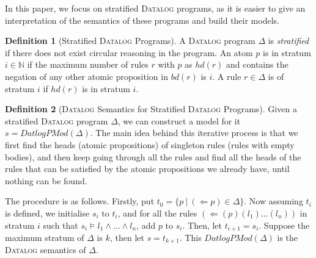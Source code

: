 \documentclass{article}
\theoremstyle{theorem}
\theoremstyle{lemma}
\theoremstyle{definition}
\newtheorem{definition}{Definition}[section]
\theoremstyle{remark}
\begin{document}
\par In this paper, we focus on stratified \textsc{Datalog} programs, as it is easier to give an interpretation of the semantics of these programs and build their models.
\begin{definition}[Stratified \textsc{Datalog} Programs]
    A \textsc{Datalog} program $\Delta$ is \textit{stratified} if there does not exist circular reasoning in the program. An atom $p$ is in stratum $i \in \mathbb{N}$ if the maximum number of rules $r$ with $p$ as $hd(r)$ and contains the negation of any other atomic proposition in $bd(r)$ is $i$. A rule $r \in \Delta$ is of stratum $i$ if $hd(r)$ is in stratum $i$.
\end{definition}
\begin{definition}[\textsc{Datalog} Semantics for Stratified \textsc{Datalog} Programs]
    Given a stratified \textsc{Datalog} program $\Delta$, we can construct a model for it $s=\textit{DatlogPMod}(\Delta)$. The main idea behind this iterative process is that we first find the heads (atomic propositions) of singleton rules (rules with empty bodies), and then keep going through all the rules and find all the heads of the rules that can be satisfied by the atomic propositions we already have, until nothing can be found.
    
    The procedure is as follows. Firstly, put $t_0=\{p \:|\: (\Leftarrow p) \in \Delta\}$. Now assuming $t_i$ is defined, we initialise $s_i$ to $t_i$, and for all the rules $(\Leftarrow (p)(l_1) \ldots(l_n))$ in stratum $i$ such that $s_i \models l_1 \wedge \ldots \wedge l_n$, add $p$ to $s_i$. Then, let $t_{i+1}=s_i$. Suppose the maximum stratum of $\Delta$ is $k$, then let $s=t_{k+1}$. This $\textit{DatlogPMod}(\Delta)$ is the \textsc{Datalog} semantics of $\Delta$.
\end{definition}
\end{document}
